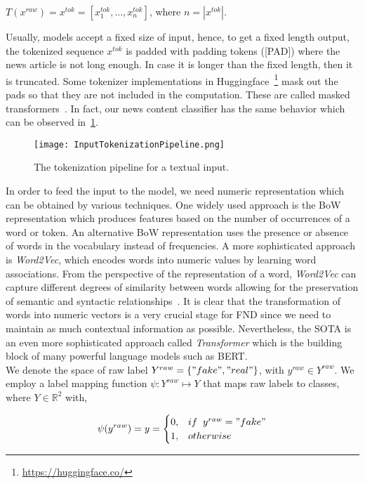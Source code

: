 \begin{center}
    $T(x^{raw}) = x^{tok} = [x_1^{tok}, \dots, x_n^{tok}]$, where $n = |x^{tok}|$.
\end{center}
Usually, models accept a fixed size of input, hence, to get a fixed length output, the tokenized sequence $x^{tok}$ is padded with padding tokens ([PAD]) where the news article is not long enough. In case it is longer than the fixed length, then it is truncated. Some tokenizer implementations in Huggingface~\footnote{\url{https://huggingface.co/}} mask out the pads so that they are not included in the computation. These are called masked transformers~\parencite{Transformers_Wolf}. In fact, our news content classifier has the same behavior which can be observed in~\ref{fig:InputTokenizationPipeline}.\\
\begin{figure}
    \centering
    \texttt{[image: InputTokenizationPipeline.png]}
    \caption[The tokenization pipeline for a textual input.]{The tokenization pipeline for a textual input.}
    \label{fig:InputTokenizationPipeline}
\end{figure}
In order to feed the input to the model, we need numeric representation which can be obtained by various techniques. One widely used approach is the BoW representation which produces features based on the number of occurrences of a word or token. An alternative BoW representation uses the presence or absence of words in the vocabulary instead of frequencies. A more sophisticated approach is \emph{Word2Vec}, which encodes words into numeric values by learning word associations. From the perspective of the representation of a word, \emph{Word2Vec} can capture different degrees of similarity between words allowing for the preservation of semantic and syntactic relationships~\parencite{Word2Vec_Mikolov}. It is clear that the transformation of words into numeric vectors is a very crucial stage for FND since we need to maintain as much contextual information as possible. Nevertheless, the SOTA is an even more sophisticated approach called \emph{Transformer} which is the building block of many powerful language models such as BERT.\\
We denote the space of raw label $Y^{raw} = \{"fake", "real"\}$, with $y^{raw} \in Y^{raw}$. We employ a label mapping function $\psi: Y^{raw} \mapsto Y$ that maps raw labels to classes, where $Y \in \mathbb{R}^2$ with,
\begin{center}
    \[\psi(y^{raw}) = y =
        \begin{cases}
            0, & if \;\; y^{raw} = "fake" \\
            1, & otherwise                \\
        \end{cases}
    \]
\end{center}
